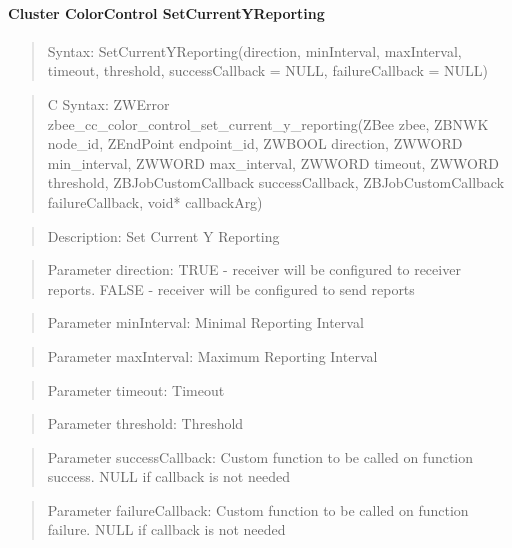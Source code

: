 \paragraph{Cluster ColorControl SetCurrentYReporting}
\begin{quote}Syntax: SetCurrentYReporting(direction, minInterval, maxInterval, timeout, threshold, successCallback = NULL, failureCallback = NULL)\end{quote}
\begin{quote}C Syntax: ZWError zbee\_cc\_color\_control\_set\_current\_y\_reporting(ZBee zbee, ZBNWK node\_id, ZEndPoint endpoint\_id, ZWBOOL direction, ZWWORD min\_interval, ZWWORD max\_interval, ZWWORD timeout, ZWWORD threshold, ZBJobCustomCallback successCallback, ZBJobCustomCallback failureCallback, void* callbackArg)\end{quote}
\begin{quote}Description: Set Current Y Reporting\end{quote}
\begin{quote}Parameter direction: TRUE  - receiver will be configured to receiver reports. FALSE - receiver will be configured to send reports\end{quote}
\begin{quote}Parameter minInterval: Minimal Reporting Interval\end{quote}
\begin{quote}Parameter maxInterval: Maximum Reporting Interval\end{quote}
\begin{quote}Parameter timeout: Timeout\end{quote}
\begin{quote}Parameter threshold: Threshold\end{quote}
\begin{quote}Parameter successCallback: Custom function to be called on function success. NULL if callback is not needed\end{quote}
\begin{quote}Parameter failureCallback: Custom function to be called on function failure. NULL if callback is not needed\end{quote}


